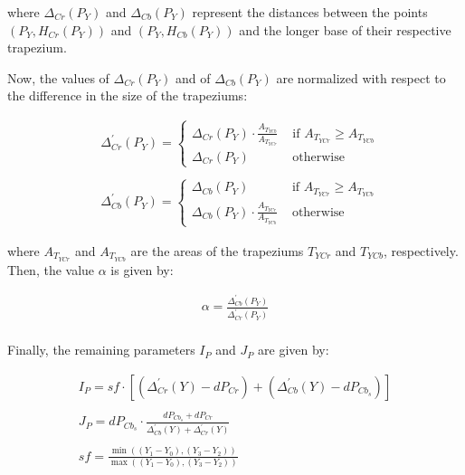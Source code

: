 where $\Delta_{Cr}(P_Y)$ and $\Delta_{Cb}(P_Y)$ represent the distances between the points $(P_Y, H_{Cr}(P_Y))$ and $(P_Y, H_{Cb}(P_Y))$ and the longer base of their respective trapezium.

\noindent Now, the values of $\Delta_{Cr}(P_Y)$ and of $\Delta_{Cb}(P_Y)$ are normalized with respect to the difference in the size of the trapeziums:

\begin{equation}
\begin{aligned}
&\Delta_{C r}^{\prime}\left(P_{Y}\right)=\left\{\begin{array}{ll}
\Delta_{C r}\left(P_{Y}\right) \cdot \frac{A_{T_{YCb}}}{A_{T_{YCr}}} & \text { if } A_{T_{YCr}} \geq A_{T_{YCb}} \\
\Delta_{C r}\left(P_{Y}\right) & \text { otherwise }
\end{array}\right. \\ \\
&\Delta_{C b}^{\prime}\left(P_{Y}\right)=\left\{\begin{array}{ll}
\Delta_{C b}\left(P_{Y}\right) & \text { if } A_{T_{YCr}} \geq A_{T_{YCb}} \\
\Delta_{C b}\left(P_{Y}\right) \cdot \frac{A_{T_{YCr}}}{A_{T_{YCb}}} & \text { otherwise }
\end{array}\right.
\end{aligned}
\end{equation}

where $A_{T_{YCr}}$ and $A_{T_{YCb}}$ are the areas of the trapeziums $T_{YCr}$ and $T_{YCb}$, respectively.
Then, the value $\alpha$ is given by:

\begin{equation}
\begin{aligned}
\alpha=\frac{\Delta_{C b}^{\prime}\left(P_{Y}\right)}{\Delta_{C r}^{\prime}\left(P_{Y}\right)}\\
\end{aligned}
\end{equation}

\noindent Finally, the remaining parameters $I_P$ and $J_P$ are given by:

\begin{equation}
\begin{aligned}
I_{P}=s f \cdot\left[\left(\Delta_{C r}^{\prime}(Y)-d P_{C r}\right)+\left(\Delta_{C b}^{\prime}(Y)-d P_{C b_{s}}\right)\right]
\\ \\
J_{P}=d P_{C b_{s}} \cdot \frac{d P_{C b_{s}}+d P_{C r}}{\Delta_{C b}^{\prime}(Y)+\Delta_{C r}^{\prime}(Y)}
\\ \\
s f=\frac{\min \left(\left(Y_{1}-Y_{0}\right),\left(Y_{3}-Y_{2}\right)\right)}{\max \left(\left(Y_{1}-Y_{0}\right),\left(Y_{3}-Y_{2}\right)\right)}
\end{aligned}
\end{equation}


